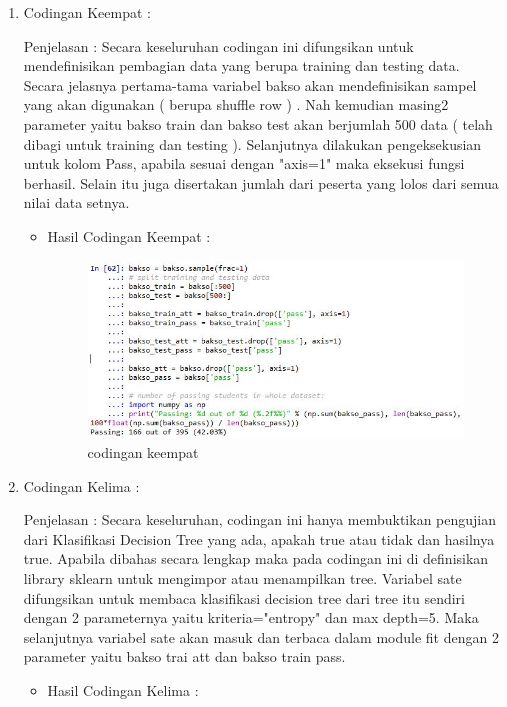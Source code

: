 \begin{enumerate}
\begin{enumerate}
\begin{enumerate}
\begin{itemize}
\end{itemize}
\par
\item Codingan Keempat :
\par Penjelasan : Secara keseluruhan codingan ini difungsikan untuk mendefinisikan pembagian data yang berupa training dan testing data. Secara jelasnya pertama-tama variabel bakso akan mendefinisikan sampel yang akan digunakan ( berupa shuffle row ) . Nah kemudian masing2 parameter yaitu bakso train dan bakso test akan berjumlah 500 data ( telah dibagi untuk training dan testing ). Selanjutnya dilakukan pengeksekusian untuk kolom Pass, apabila sesuai dengan "axis=1" maka eksekusi fungsi berhasil. Selain itu juga disertakan jumlah dari peserta yang lolos dari semua nilai data setnya.  
\par 
\begin{itemize}
\par
\item Hasil Codingan Keempat :

\begin{figure}[ht]
\centering
\includegraphics[scale=0.4]{figures/hasil4.jpg}
\caption{codingan keempat}
\label{contoh}
\end{figure}

\end{itemize}
\par
\item Codingan Kelima :
\par Penjelasan : Secara keseluruhan, codingan ini hanya membuktikan pengujian dari Klasifikasi Decision Tree yang ada, apakah true atau tidak dan hasilnya true. Apabila dibahas secara lengkap maka pada codingan ini di definisikan library sklearn untuk mengimpor atau menampilkan tree. Variabel sate difungsikan untuk membaca klasifikasi decision tree dari tree itu sendiri dengan 2 parameternya yaitu kriteria="entropy" dan max depth=5. Maka selanjutnya variabel sate akan masuk dan terbaca dalam module fit dengan 2 parameter yaitu bakso trai att dan bakso train pass.
\par 
\begin{itemize}
\par
\item Hasil Codingan Kelima :


\end{itemize}
\end{enumerate}
\end{enumerate}
\end{enumerate}
